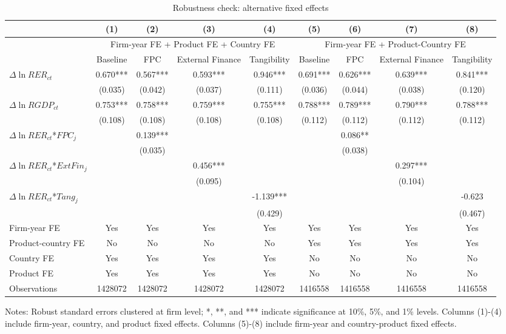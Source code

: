 \begin{table}
	\centering
	\caption{Robustness check: alternative fixed effects}
	\begin{threeparttable}
		\begin{tabular}{lcccccccc}
			\toprule
			& (1)   & (2)   & (3)   & (4) &  (5)  &  (6)  & (7)  & (8)\\
			\midrule
			& \multicolumn{4}{c}{Firm-year FE + Product FE + Country FE} & \multicolumn{4}{c}{Firm-year FE + Product-Country FE}\\
			& Baseline & FPC   & External Finance & Tangibility & Baseline & FPC & External Finance & Tangibility\\
			\midrule
			$\Delta \ln RER_{ct}$ & 0.670*** & 0.567*** & 0.593*** & 0.946*** & 0.691*** & 0.626*** & 0.639*** & 0.841*** \\
                & (0.035) & (0.042) & (0.037) & (0.111) & (0.036) & (0.044) & (0.038) & (0.120) \\
			$\Delta \ln RGDP_{ct}$ & 0.753*** & 0.758*** & 0.759*** & 0.755*** & 0.788*** & 0.789*** & 0.790*** & 0.788*** \\
			& (0.108) & (0.108) & (0.108) & (0.108) & (0.112) & (0.112) & (0.112) & (0.112) \\
			$\Delta \ln RER_{ct}$*$FPC_{j}$ &  & 0.139*** &       &       &       & 0.086** &       &  \\
			&  & (0.035) &       &       &       & (0.038) &       &  \\
			$\Delta \ln RER_{ct}$*$ExtFin_{j}$ &   &       & 0.456*** &       &       &       & 0.297*** &  \\
			&  &       & (0.095) &       &       &       & (0.104) &  \\
			$\Delta \ln RER_{ct}$*$Tang_{j}$ &   &       &       & -1.139*** &       &       &       & -0.623 \\
			&   &       &       & (0.429) &       &       &       & (0.467) \\
			Firm-year FE  &  Yes   & Yes   & Yes & Yes & Yes & Yes & Yes & Yes\\
			Product-country FE & No & No & No & No & Yes & Yes & Yes & Yes\\
			Country FE &  Yes   & Yes   & Yes   & Yes & No & No & No & No\\
			Product FE &  Yes   & Yes   & Yes   & Yes & No & No & No & No\\
			Observations & 1428072 & 1428072 & 1428072 & 1428072 & 1416558 & 1416558 & 1416558 & 1416558 \\
			\bottomrule
		\end{tabular}
		\begin{tablenotes}
			\footnotesize
			\item[Notes:] Robust standard errors clustered at firm level; *, **, and *** indicate significance at 10\%, 5\%, and 1\% levels. Columns (1)-(4) include firm-year, country, and product fixed effects.  Columns (5)-(8) include firm-year and country-product fixed effects.
		\end{tablenotes}
	\end{threeparttable}
	\label{tab.robust.fe}
\end{table}

